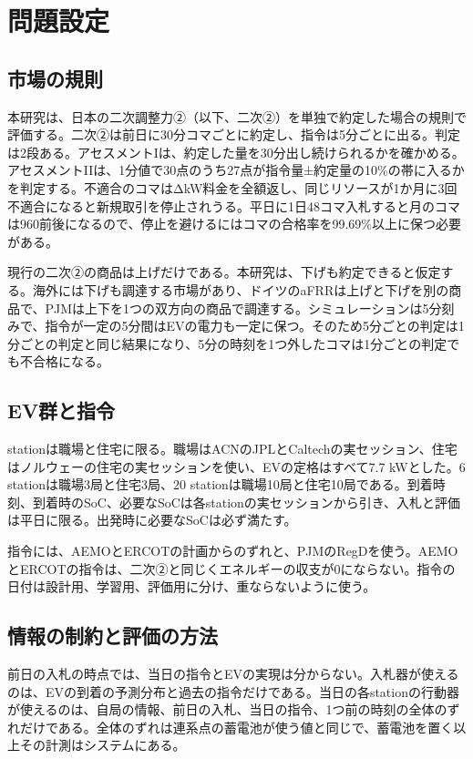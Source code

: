 \documentclass[lettersize,journal]{IEEEtran}
\begin{document}
\section{問題設定}
\subsection{市場の規則}
本研究は、日本の二次調整力②（以下、二次②）を単独で約定した場合の規則で評価する。二次②は前日に30分コマごとに約定し、指令は5分ごとに出る。判定は2段ある。アセスメントIは、約定した量を30分出し続けられるかを確かめる。アセスメントIIは、1分値で30点のうち27点が指令量±約定量の10\%の帯に入るかを判定する。不適合のコマはΔkW料金を全額返し、同じリソースが1か月に3回不適合になると新規取引を停止されうる\cite{ref15}。平日に1日48コマ入札すると月のコマは960前後になるので、停止を避けるにはコマの合格率を99.69\%以上に保つ必要がある。

現行の二次②の商品は上げだけである。本研究は、下げも約定できると仮定する。海外には下げも調達する市場があり、ドイツのaFRRは上げと下げを別の商品で、PJMは上下を1つの双方向の商品で調達する。シミュレーションは5分刻みで、指令が一定の5分間はEVの電力も一定に保つ。そのため5分ごとの判定は1分ごとの判定と同じ結果になり、5分の時刻を1つ外したコマは1分ごとの判定でも不合格になる。

\subsection{EV群と指令}
stationは職場と住宅に限る。職場はACNのJPLとCaltechの実セッション\cite{ref13}、住宅はノルウェーの住宅の実セッション\cite{ref14}を使い、EVの定格はすべて7.7 kWとした。6 stationは職場3局と住宅3局、20 stationは職場10局と住宅10局である。到着時刻、到着時のSoC、必要なSoCは各stationの実セッションから引き、入札と評価は平日に限る。出発時に必要なSoCは必ず満たす。

指令には、AEMOとERCOTの計画からのずれと、PJMのRegDを使う\cite{ref24}。AEMOとERCOTの指令は、二次②と同じくエネルギーの収支が0にならない。指令の日付は設計用、学習用、評価用に分け、重ならないように使う。

\subsection{情報の制約と評価の方法}
前日の入札の時点では、当日の指令とEVの実現は分からない。入札器が使えるのは、EVの到着の予測分布と過去の指令だけである。当日の各stationの行動器が使えるのは、自局の情報、前日の入札、当日の指令、1つ前の時刻の全体のずれだけである。全体のずれは連系点の蓄電池が使う値と同じで、蓄電池を置く以上その計測はシステムにある。
\end{document}

